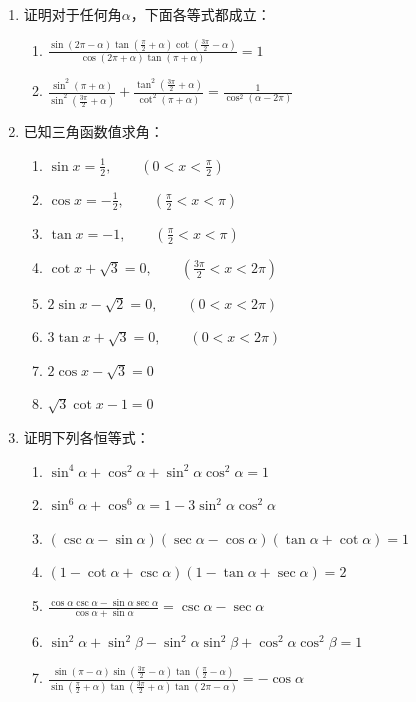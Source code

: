 \begin{enumerate}
\item 证明对于任何角$\alpha$，下面各等式都成立：
\begin{enumerate}
    \item $\frac{\sin(2\pi-\alpha)\tan\left(\frac{\pi}{2}+\alpha\right)\cot\left(\frac{3\pi}{2}-\alpha\right)}{\cos(2\pi+\alpha)\tan(\pi+\alpha)}=1$
    \item $\frac{\sin^2(\pi+\alpha)}{\sin^2\left(\frac{3\pi}{2}+\alpha\right)}+\frac{\tan^2\left(\frac{3\pi}{2}+\alpha\right)}{\cot^2(\pi+\alpha)}=\frac{1}{\cos^2(\alpha-2\pi)}$
\end{enumerate}

\item 已知三角函数值求角：
\begin{enumerate}
    \item $\sin x=\frac{1}{2},\qquad \left(0<x<\frac{\pi}{2}\right)$
    \item $\cos x=-\frac{1}{2},\qquad \left(\frac{\pi}{2}<x<{\pi}\right)$
    \item $\tan x=-1,\qquad \left(\frac{\pi}{2}<x<\pi\right)$
    \item $\cot x+\sqrt{3}=0,\qquad \left(\frac{3\pi}{2}<x<2\pi\right)$
    \item $2\sin x-\sqrt{2}=0,\qquad (0<x<2\pi)$
    \item $3\tan x+\sqrt{3}=0,\qquad (0<x<2\pi)$
    \item $2\cos x-\sqrt{3}=0$
    \item $\sqrt{3}\cot x-1=0$
\end{enumerate}

\item 证明下列各恒等式：
\begin{enumerate}
    \item $\sin ^{4} \alpha+\cos ^{2} \alpha+\sin ^{2} \alpha \cos ^{2} \alpha=1$
    \item $\sin ^{6} \alpha+\cos ^{6} \alpha=1-3 \sin ^{2} \alpha \cos ^{2} \alpha$
    \item $(\csc \alpha-\sin \alpha)(\sec \alpha-\cos \alpha)(\tan \alpha+\cot  \alpha)=1$
    \item $(1-\cot  \alpha+\csc \alpha)(1-\tan \alpha+\sec \alpha)=2$
    \item $\frac{\cos \alpha \csc \alpha-\sin \alpha \sec \alpha}{\cos \alpha+\sin \alpha}=\csc \alpha-\sec \alpha$
    \item $\sin ^{2} \alpha+\sin ^{2} \beta-\sin ^{2} \alpha \sin ^{2} \beta+\cos ^{2} \alpha \cos ^{2} \beta=1$
    \item $\frac{\sin (\pi-\alpha) \sin \left(\frac{3 \pi}{2}-\alpha\right) \tan\left(\frac{\pi}{2}-\alpha\right)}{\sin \left(\frac{\pi}{2}+\alpha\right) \tan\left(\frac{3 \pi}{2}+\alpha\right) \tan(2 \pi-\alpha)} 
=-\cos \alpha$


\end{enumerate}
\end{enumerate}
